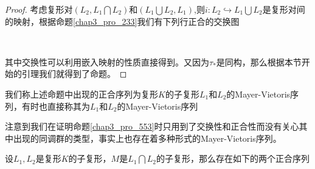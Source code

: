 \begin{proof}
考虑复形对$(L_{2},L_{1}\bigcap L_{2})$和$(L_{1}\bigcup L_{2},L_{1})$,则$i:L_{2}\hookrightarrow L_{1}\bigcup L_{2}$是复形对间的映射，根据命题\eqref{chap3_pro_233}我们有下列行正合的交换图
{\center
{}\\}
其中交换性可以利用嵌入映射的性质直接得到。又因为$\tau_{*}$是同构，那么根据本节开始的引理我们就得到了命题。
\end{proof}
\begin{definition}
我们称上述命题中出现的正合序列为复形$K$的子复形$L_{1}$和$L_{2}$的Mayer-Vietoris序列，有时也直接称其为$L_{1}$和$L_{2}$的Mayer-Vietoris序列
\end{definition}
注意到我们在证明命题\eqref{chap3_pro_553}时只用到了交换性和正合性而没有关心其中出现的同调群的类型，事实上也存在着多种形式的Mayer-Vietoris序列。
\begin{proposition}
设$L_{1},L_{2}$是复形$K$的子复形，$M$是$L_{1}\bigcap L_{2}$的子复形，那么存在如下的两个正合序列
{\center
\footnotesize
{}
\\}
{\center
\footnotesize
{}
\\}
\end{proposition}

